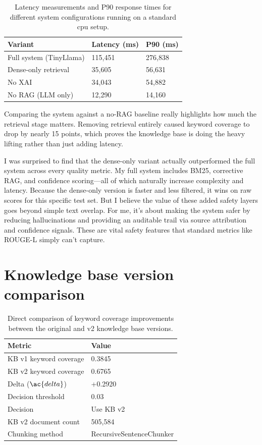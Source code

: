 \begin{table}[htbp]
\centering
\caption{Latency measurements and P90 response times for different system configurations running on a standard \ac{cpu} setup.}
\label{tab:baseline_latency}
\renewcommand{\arraystretch}{1.3}
\begin{tabular}{|l|l|l|}
\hline
\textbf{Variant} & \textbf{Latency (ms)} & \textbf{P90 (ms)} \\
\hline
Full system (TinyLlama) & 115,451 & 276,838 \\
Dense-only retrieval    & 35,605  & 56,631  \\
No XAI                  & 34,043  & 54,882  \\
No RAG (LLM only)       & 12,290  & 14,160  \\
\hline
\end{tabular}
\end{table}

Comparing the system against a no-RAG baseline really highlights how much the retrieval stage matters. Removing retrieval entirely caused keyword coverage to drop by nearly 15 points, which proves the knowledge base is doing the heavy lifting rather than just adding latency.

I was surprised to find that the dense-only variant actually outperformed the full system across every quality metric. My full system includes BM25, corrective RAG, and confidence scoring---all of which naturally increase complexity and latency. Because the dense-only version is faster and less filtered, it wins on raw scores for this specific test set. But I believe the value of these added safety layers goes beyond simple text overlap. For me, it's about making the system safer by reducing hallucinations and providing an auditable trail via source attribution and confidence signals. These are vital safety features that standard metrics like ROUGE-L simply can't capture.

\section{Knowledge base version comparison}

\begin{table}[htbp]
\centering
\caption{Direct comparison of keyword coverage improvements between the original and v2 knowledge base versions.}
\renewcommand{\arraystretch}{1.3}
\begin{tabular}{|l|l|}
\hline
\textbf{Metric} & \textbf{Value} \\
\hline
KB v1 keyword coverage & 0.3845 \\
KB v2 keyword coverage & 0.6765 \\
Delta ($\ac{delta}$) & +0.2920 \\
Decision threshold & 0.03 \\
Decision & Use KB v2 \\
KB v2 document count & 505,584 \\
Chunking method & RecursiveSentenceChunker \\
\hline
\end{tabular}
\end{table}

